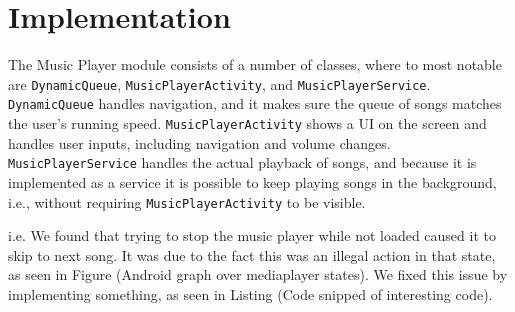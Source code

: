 \section{Implementation}
The Music Player module consists of a number of classes, where to most notable are \texttt{DynamicQueue}, \texttt{MusicPlayerActivity}, and \texttt{MusicPlayerService}. \texttt{DynamicQueue} handles navigation, and it makes sure the queue of songs matches the user's running speed. \texttt{MusicPlayerActivity} shows a UI on the screen and handles user inputs, including navigation and volume changes. \texttt{MusicPlayerService} handles the actual playback of songs, and because it is implemented as a service it is possible to keep playing songs in the background, i.e., without requiring \texttt{MusicPlayerActivity} to be visible.


i.e. We found that trying to stop the music player while not loaded caused it to skip to next song. It was due to the fact this was an illegal action in that state, as seen in Figure (Android graph over mediaplayer states). We fixed this issue by implementing something, as seen in Listing (Code snipped of interesting code).